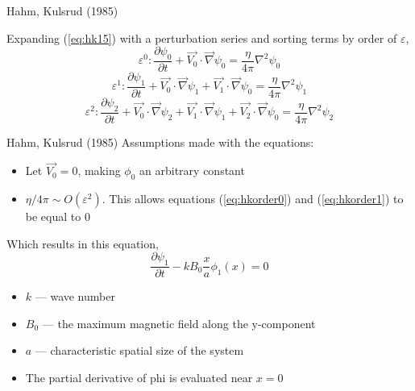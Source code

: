 \documentclass[compress]{beamer}
\newcounter{Segment}
\newcommand{\finishSegment}{\label{endSegment\theSegment}}
\begin{document}
\begin{frame}{Hahm, Kulsrud (1985) \cite{hahmkulsrud}}

    Expanding (\ref{eq:hk15}) with a perturbation series and sorting terms by order of $\varepsilon$,
    \begin{equation}
        \label{eq:hkorder0}
        \varepsilon^0: \frac{\partial \psi_0}{\partial t} +\vec{V_0}\cdot \vec{\nabla}\psi_0=\frac{\eta}{4\pi}\nabla^2 \psi_0
    \end{equation} 
    \begin{equation}
        \label{eq:hkorder1}
        \varepsilon^1: \frac{\partial \psi_1}{\partial t} +\vec{V_0}\cdot \vec{\nabla}\psi_1+\vec{V_1}\cdot \vec{\nabla}\psi_0=\frac{\eta}{4\pi}\nabla^2 \psi_1
    \end{equation} 
    \begin{equation}
        \label{eq:hkorder2}
        \varepsilon^2: \frac{\partial \psi_2}{\partial t} +\vec{V_0}\cdot \vec{\nabla}\psi_2+\vec{V_1}\cdot \vec{\nabla}\psi_1+\vec{V_2}\cdot \vec{\nabla}\psi_0=\frac{\eta}{4\pi}\nabla^2 \psi_2
    \end{equation} 
\end{frame}

\begin{frame}{Hahm, Kulsrud (1985) \cite{hahmkulsrud}}
   Assumptions made with the equations:
   \begin{itemize}
       \item Let $\vec{V_0}=0$, making $\phi_0$ an arbitrary constant
       \item $\eta / 4\pi \sim O\left( \varepsilon^2 \right)$. This allows equations (\ref{eq:hkorder0}) and (\ref{eq:hkorder1}) to be equal to 0
   \end{itemize} 
   Which results in this equation,
   \begin{equation}
       \frac{\partial \psi_1}{\partial t} -kB_0 \frac{x}{a}\phi_1(x)=0
   \end{equation} 
   \begin{itemize}
       \item $k$ --- wave number
       \item $B_0$ --- the maximum magnetic field along the y-component
       \item $a$ --- characteristic spatial size of the system
       \item The partial derivative of phi is evaluated near $x=0$
   \end{itemize}
   \finishSegment
\end{frame}
\end{document}
